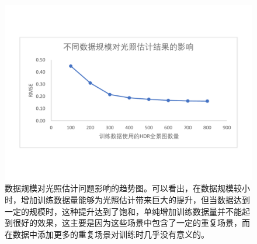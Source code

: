 \begin{figure}[!htbp]
    \centering
    \includegraphics[width=1.0\textwidth]{Img/eval-data-size.pdf}
    \caption[数据规模对光照估计问题影响的趋势图]
    {数据规模对光照估计问题影响的趋势图。可以看出，在数据规模较小时，增加训练数据量能够为光照估计带来巨大的提升，但当数据达到一定的规模时，这种提升达到了饱和，单纯增加训练数据量并不能起到很好的效果，这主要是因为这些场景中包含了一定的重复场景，而在数据中添加更多的重复场景对训练时几乎没有意义的。}
    \label{fig:eval-data-size}
\end{figure}